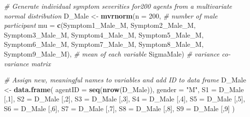 \documentclass[]{article}
\newenvironment{Shaded}{\begin{snugshade}}{\end{snugshade}}
\newcommand{\KeywordTok}[1]{\textcolor[rgb]{0.13,0.29,0.53}{\textbf{#1}}}
\newcommand{\DataTypeTok}[1]{\textcolor[rgb]{0.13,0.29,0.53}{#1}}
\newcommand{\DecValTok}[1]{\textcolor[rgb]{0.00,0.00,0.81}{#1}}
\newcommand{\StringTok}[1]{\textcolor[rgb]{0.31,0.60,0.02}{#1}}
\newcommand{\CommentTok}[1]{\textcolor[rgb]{0.56,0.35,0.01}{\textit{#1}}}
\newcommand{\NormalTok}[1]{#1}
\begin{document}
\begin{Shaded}
\begin{Highlighting}[]
\CommentTok{# Generate individual symptom severities for200 agents from a multivariate normal distribution}
\NormalTok{D_Male <-}\StringTok{ }\KeywordTok{mvrnorm}\NormalTok{(}\DataTypeTok{n =} \DecValTok{200}\NormalTok{, }\CommentTok{# number of male participant}
                  \DataTypeTok{mu =} \KeywordTok{c}\NormalTok{(Symptom1_Male_M, Symptom2_Male_M, Symptom3_Male_M, Symptom4_Male_M, Symptom5_Male_M, Symptom6_Male_M, Symptom7_Male_M, Symptom8_Male_M, Symptom9_Male_M), }\CommentTok{# mean of each variable}
\NormalTok{                  SigmaMale) }\CommentTok{# variance co-variance matrix}

\CommentTok{# Assign new, meaningful names to variables and add ID to data frame}
\NormalTok{D_Male <-}\StringTok{ }\KeywordTok{data.frame}\NormalTok{(}
  \DataTypeTok{agentID =} \KeywordTok{seq}\NormalTok{(}\KeywordTok{nrow}\NormalTok{(D_Male)),}
  \DataTypeTok{gender =} \StringTok{"M"}\NormalTok{,}
  \DataTypeTok{S1 =}\NormalTok{ D_Male [,}\DecValTok{1}\NormalTok{],}
  \DataTypeTok{S2 =}\NormalTok{  D_Male [,}\DecValTok{2}\NormalTok{],}
  \DataTypeTok{S3 =}\NormalTok{  D_Male [,}\DecValTok{3}\NormalTok{],}
  \DataTypeTok{S4 =}\NormalTok{ D_Male [,}\DecValTok{4}\NormalTok{],}
  \DataTypeTok{S5 =}\NormalTok{ D_Male [,}\DecValTok{5}\NormalTok{],}
  \DataTypeTok{S6 =}\NormalTok{  D_Male [,}\DecValTok{6}\NormalTok{],}
  \DataTypeTok{S7 =}\NormalTok{  D_Male [,}\DecValTok{7}\NormalTok{],}
  \DataTypeTok{S8 =}\NormalTok{ D_Male [,}\DecValTok{8}\NormalTok{],}
  \DataTypeTok{S9 =}\NormalTok{ D_Male [,}\DecValTok{9}\NormalTok{]}
\NormalTok{)}



\end{Highlighting}
\end{Shaded}
\end{document}
